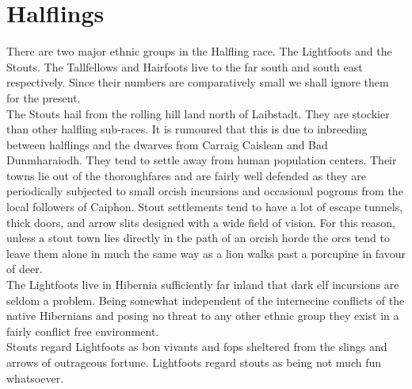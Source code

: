 \documentclass[a4paper]{dnd5}
\begin{document}
\section*{Halflings}


There are two major ethnic groups in the Halfling race.  The Lightfoots and the Stouts. The Tallfellows and Hairfoots live to the far south and south east respectively.  Since their numbers are comparatively small we shall ignore them for the present.\\

The Stouts hail from the rolling hill land north of Laibstadt.  They are stockier than other halfling sub-races.  It is rumoured that this is due to inbreeding between halflings and the dwarves from Carraig Caislean and Bad Dunmharaiodh.   They tend to settle away from human population centers.  Their towns lie out of the thoroughfares and are fairly well defended as they are periodically subjected to small orcish incursions and occasional pogroms from the local followers of Caiphon.  Stout settlements tend to have a lot of escape tunnels, thick doors, and arrow slits designed with a wide field of vision.  For this reason, unless a stout town lies directly in the path of an orcish horde the orcs tend to leave them alone in much the same way as a lion walks past a porcupine in favour of deer. \\

The Lightfoots live in Hibernia sufficiently far inland that dark elf incursions are seldom a problem.  Being somewhat independent of the internecine conflicts of the native Hibernians and posing no threat to any other ethnic group they exist in a fairly conflict free environment.  \\

Stouts regard Lightfoots as bon vivants and fops sheltered from the slings and arrows of outrageous fortune.  Lightfoots regard stouts as being not much fun whatsoever.
\end{document}
